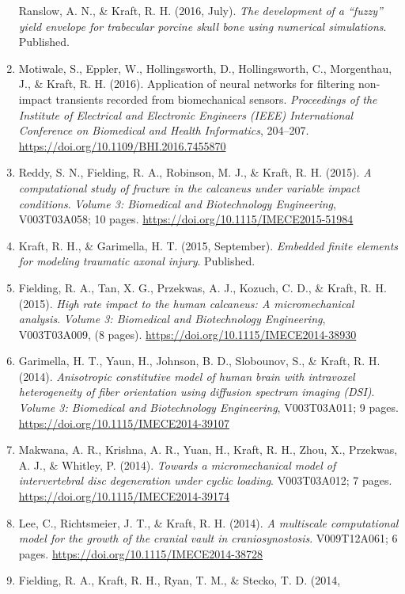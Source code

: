 \documentclass[
]{article}
\begin{document}
\begin{enumerate}
  Ranslow, A. N., \& Kraft, R. H. (2016, July). \emph{The development of
  a ``fuzzy'' yield envelope for trabecular porcine skull bone using
  numerical simulations}. Published.
\item
  Motiwale, S., Eppler, W., Hollingsworth, D., Hollingsworth, C.,
  Morgenthau, J., \& Kraft, R. H. (2016). Application of neural networks
  for filtering non-impact transients recorded from biomechanical
  sensors. \emph{Proceedings of the Institute of Electrical and
  Electronic Engineers (IEEE) International Conference on Biomedical and
  Health Informatics}, 204--207.
  \url{https://doi.org/10.1109/BHI.2016.7455870}
\item
  Reddy, S. N., Fielding, R. A., Robinson, M. J., \& Kraft, R. H.
  (2015). \emph{A computational study of fracture in the calcaneus under
  variable impact conditions}. \emph{Volume 3: Biomedical and
  Biotechnology Engineering}, V003T03A058; 10 pages.
  \url{https://doi.org/10.1115/IMECE2015-51984}
\item
  Kraft, R. H., \& Garimella, H. T. (2015, September). \emph{Embedded
  finite elements for modeling traumatic axonal injury}. Published.
\item
  Fielding, R. A., Tan, X. G., Przekwas, A. J., Kozuch, C. D., \& Kraft,
  R. H. (2015). \emph{High rate impact to the human calcaneus: A
  micromechanical analysis}. \emph{Volume 3: Biomedical and
  Biotechnology Engineering}, V003T03A009, (8 pages).
  \url{https://doi.org/10.1115/IMECE2014-38930}
\item
  Garimella, H. T., Yaun, H., Johnson, B. D., Slobounov, S., \& Kraft,
  R. H. (2014). \emph{Anisotropic constitutive model of human brain with
  intravoxel heterogeneity of fiber orientation using diffusion spectrum
  imaging (DSI)}. \emph{Volume 3: Biomedical and Biotechnology
  Engineering}, V003T03A011; 9 pages.
  \url{https://doi.org/10.1115/IMECE2014-39107}
\item
  Makwana, A. R., Krishna, A. R., Yuan, H., Kraft, R. H., Zhou, X.,
  Przekwas, A. J., \& Whitley, P. (2014). \emph{Towards a
  micromechanical model of intervertebral disc degeneration under cyclic
  loading}. V003T03A012; 7 pages.
  \url{https://doi.org/10.1115/IMECE2014-39174}
\item
  Lee, C., Richtsmeier, J. T., \& Kraft, R. H. (2014). \emph{A
  multiscale computational model for the growth of the cranial vault in
  craniosynostosis}. V009T12A061; 6 pages.
  \url{https://doi.org/10.1115/IMECE2014-38728}
\item
  Fielding, R. A., Kraft, R. H., Ryan, T. M., \& Stecko, T. D. (2014,

\end{enumerate}
\end{document}
